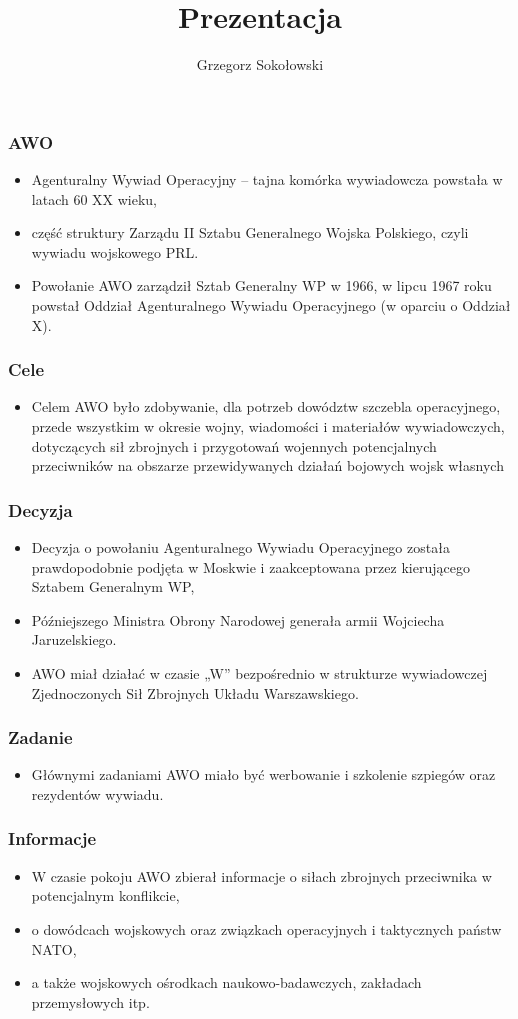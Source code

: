 \documentclass[]{beamer}
\title{Prezentacja}
\author{Grzegorz Sokołowski}
\begin{document}
\maketitle
\frame
{
\frametitle{AWO}
\begin{itemize}
\item Agenturalny Wywiad Operacyjny – tajna komórka wywiadowcza powstała w latach 60 XX wieku, 
\item część struktury Zarządu II Sztabu Generalnego Wojska Polskiego, czyli wywiadu wojskowego PRL.
\item Powołanie AWO zarządził Sztab Generalny WP w 1966, w lipcu 1967 roku powstał Oddział Agenturalnego Wywiadu Operacyjnego (w oparciu o Oddział X).
\end{itemize}
}


\frame
{
\frametitle{Cele}
\begin{itemize}
\item Celem AWO było zdobywanie, dla potrzeb dowództw szczebla operacyjnego, przede wszystkim w okresie wojny, wiadomości i materiałów wywiadowczych, dotyczących sił zbrojnych i przygotowań wojennych potencjalnych przeciwników na obszarze przewidywanych działań bojowych wojsk własnych
\end{itemize}
}


\frame
{
\frametitle{Decyzja}
\begin{itemize}
\item Decyzja o powołaniu Agenturalnego Wywiadu Operacyjnego została prawdopodobnie podjęta w Moskwie i zaakceptowana przez kierującego Sztabem Generalnym WP,
\item Późniejszego Ministra Obrony Narodowej generała armii Wojciecha Jaruzelskiego.
\item AWO miał działać w czasie „W” bezpośrednio w strukturze wywiadowczej Zjednoczonych Sił Zbrojnych Układu Warszawskiego.
\end{itemize}
}

\frame
{
\frametitle{Zadanie}
\begin{itemize}
\item Głównymi zadaniami AWO miało być werbowanie i szkolenie szpiegów oraz rezydentów wywiadu.
\end{itemize}
}


\frame
{
\frametitle{Informacje}
\begin{itemize}
\item W czasie pokoju AWO zbierał informacje o siłach zbrojnych przeciwnika w potencjalnym konflikcie,
\item o dowódcach wojskowych oraz związkach operacyjnych i taktycznych państw NATO,
\item a także wojskowych ośrodkach naukowo-badawczych, zakładach przemysłowych itp.
\end{itemize}
}
\end{document}
